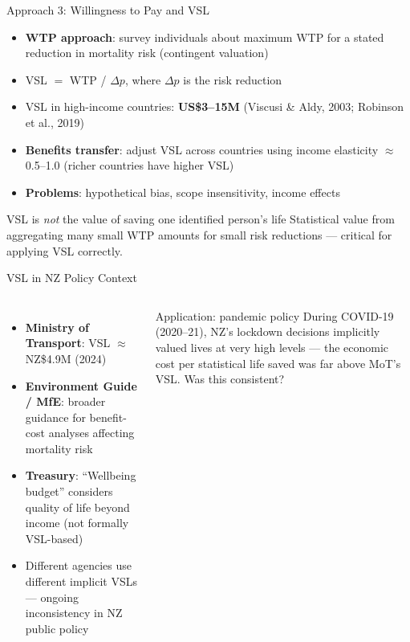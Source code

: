 \documentclass[aspectratio=169, 12pt]{beamer}
\begin{document}
\begin{frame}{Approach 3: Willingness to Pay and VSL}
  \small
  \begin{itemize}
    \item \textbf{WTP approach}: survey individuals about maximum WTP for a stated reduction
          in mortality risk (contingent valuation)
    \item VSL $=$ WTP / $\Delta p$, where $\Delta p$ is the risk reduction
    \item VSL in high-income countries: \textbf{US\$3--15M} (Viscusi \& Aldy, 2003; Robinson et al., 2019)
    \item \textbf{Benefits transfer}: adjust VSL across countries using income elasticity
          $\approx$0.5--1.0 (richer countries have higher VSL)
    \item \textbf{Problems}: hypothetical bias, scope insensitivity, income effects
  \end{itemize}
  \begin{alertblock}{VSL is \emph{not} the value of saving one identified person's life}
    \small Statistical value from aggregating many small WTP amounts for small risk reductions --- critical for applying VSL correctly.
  \end{alertblock}
\end{frame}

\begin{frame}{VSL in NZ Policy Context}
  \begin{columns}
      \footnotesize
      \begin{itemize}
        \item \textbf{Ministry of Transport}: VSL $\approx$NZ\$4.9M (2024)
        \item \textbf{Environment Guide / MfE}: broader guidance for benefit-cost analyses affecting mortality risk
        \item \textbf{Treasury}: ``Wellbeing budget'' considers quality of life beyond income (not formally VSL-based)
        \item Different agencies use different implicit VSLs --- ongoing inconsistency in NZ public policy
      \end{itemize}
      \begin{alertblock}{Application: pandemic policy}
        \footnotesize During COVID-19 (2020--21), NZ's lockdown decisions implicitly valued lives at very high levels --- the economic cost per statistical life saved was far above MoT's VSL. Was this consistent?
      \end{alertblock}
  \end{columns}
\end{frame}
\end{document}
